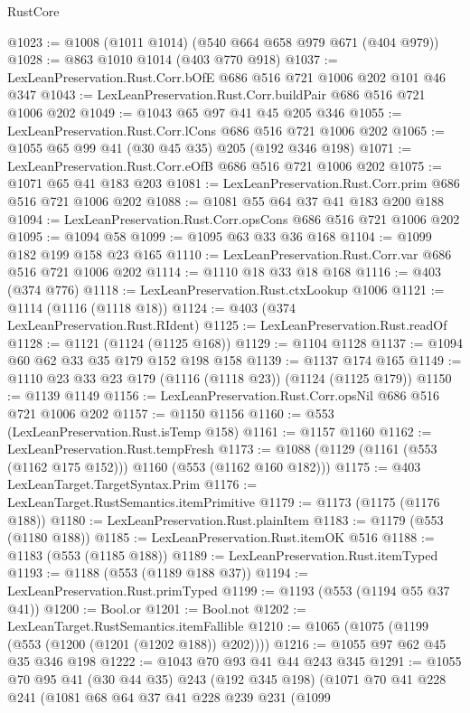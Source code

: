 \begin{lexlean}{RustCore}
\begin{coremodule}
@1023 := @1008 (@1011 @1014) (@540 @664 @658 @979 @671 (@404 @979))
@1028 := @863 @1010 @1014 (@403 @770 @918)
@1037 := LexLeanPreservation.Rust.Corr.bOfE @686 @516 @721 @1006 @202 @101 @46 @347
@1043 := LexLeanPreservation.Rust.Corr.buildPair @686 @516 @721 @1006 @202
@1049 := @1043 @65 @97 @41 @45 @205 @346
@1055 := LexLeanPreservation.Rust.Corr.lCons @686 @516 @721 @1006 @202
@1065 := @1055 @65 @99 @41 (@30 @45 @35) @205 (@192 @346 @198)
@1071 := LexLeanPreservation.Rust.Corr.eOfB @686 @516 @721 @1006 @202
@1075 := @1071 @65 @41 @183 @203
@1081 := LexLeanPreservation.Rust.Corr.prim @686 @516 @721 @1006 @202
@1088 := @1081 @55 @64 @37 @41 @183 @200 @188
@1094 := LexLeanPreservation.Rust.Corr.opsCons @686 @516 @721 @1006 @202
@1095 := @1094 @58
@1099 := @1095 @63 @33 @36 @168
@1104 := @1099 @182 @199 @158 @23 @165
@1110 := LexLeanPreservation.Rust.Corr.var @686 @516 @721 @1006 @202
@1114 := @1110 @18 @33 @18 @168
@1116 := @403 (@374 @776)
@1118 := LexLeanPreservation.Rust.ctxLookup @1006
@1121 := @1114 (@1116 (@1118 @18))
@1124 := @403 (@374 LexLeanPreservation.Rust.RIdent)
@1125 := LexLeanPreservation.Rust.readOf
@1128 := @1121 (@1124 (@1125 @168))
@1129 := @1104 @1128
@1137 := @1094 @60 @62 @33 @35 @179 @152 @198 @158
@1139 := @1137 @174 @165
@1149 := @1110 @23 @33 @23 @179 (@1116 (@1118 @23)) (@1124 (@1125 @179))
@1150 := @1139 @1149
@1156 := LexLeanPreservation.Rust.Corr.opsNil @686 @516 @721 @1006 @202
@1157 := @1150 @1156
@1160 := @553 (LexLeanPreservation.Rust.isTemp @158)
@1161 := @1157 @1160
@1162 := LexLeanPreservation.Rust.tempFresh
@1173 := @1088 (@1129 (@1161 (@553 (@1162 @175 @152))) @1160 (@553 (@1162 @160 @182)))
@1175 := @403 LexLeanTarget.TargetSyntax.Prim
@1176 := LexLeanTarget.RustSemantics.itemPrimitive
@1179 := @1173 (@1175 (@1176 @188))
@1180 := LexLeanPreservation.Rust.plainItem
@1183 := @1179 (@553 (@1180 @188))
@1185 := LexLeanPreservation.Rust.itemOK @516
@1188 := @1183 (@553 (@1185 @188))
@1189 := LexLeanPreservation.Rust.itemTyped
@1193 := @1188 (@553 (@1189 @188 @37))
@1194 := LexLeanPreservation.Rust.primTyped
@1199 := @1193 (@553 (@1194 @55 @37 @41))
@1200 := Bool.or
@1201 := Bool.not
@1202 := LexLeanTarget.RustSemantics.itemFallible
@1210 := @1065 (@1075 (@1199 (@553 (@1200 (@1201 (@1202 @188)) @202))))
@1216 := @1055 @97 @62 @45 @35 @346 @198
@1222 := @1043 @70 @93 @41 @44 @243 @345
@1291 := @1055
    @70
    @95
    @41
    (@30 @44 @35)
    @243
    (@192 @345 @198)
    (@1071
      @70
      @41
      @228
      @241
      (@1081
        @68
        @64
        @37
        @41
        @228
        @239
        @231
        (@1099

\end{coremodule}
\end{lexlean}
